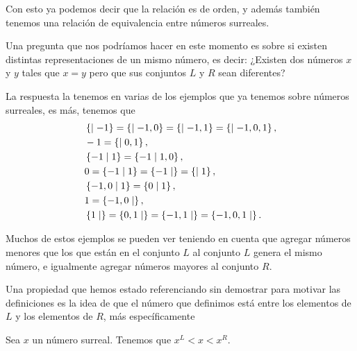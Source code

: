     Con esto ya podemos decir que la relaci\'on es de orden, y adem\'as tambi\'en tenemos una relaci\'on de equivalencia entre n\'umeros surreales.

    Una pregunta que nos podr\'iamos hacer en este momento es sobre si existen distintas representaciones de un mismo n\'umero, es decir: ¿Existen dos n\'umeros $x$ y $y$ tales que $x=y$ pero que sus conjuntos $L$ y $R$ sean diferentes?

    La respuesta la tenemos en varias de los ejemplos que ya tenemos sobre n\'umeros surreales, es m\'as, tenemos que
    \begin{align*}
        &\left\{\mid -1\right\} = \left\{\mid -1,0\right\} = \left\{\mid -1,1\right\} = \left\{\mid -1,0,1\right\}, \\
        &-1 = \left\{\mid 0,1\right\},\\
        &\left\{-1\mid 1\right\} = \left\{-1\mid 1,0\right\},\\
        &0 = \left\{-1\mid 1\right\} = \left\{-1\mid \right\} = \left\{\mid 1\right\},\\
        &\left\{-1,0\mid 1\right\} = \left\{0\mid 1\right\},\\
        &1 = \left\{-1,0\mid \right\},\\
        &\left\{1\mid \right\} = \left\{0,1\mid \right\} = \left\{-1,1\mid \right\} = \left\{-1,0,1\mid \right\}.
    \end{align*}

    Muchos de estos ejemplos se pueden ver teniendo en cuenta que agregar n\'umeros menores que los que est\'an en el conjunto $L$ al conjunto $L$ genera el mismo n\'umero, e igualmente agregar n\'umeros mayores al conjunto $R$.

    Una propiedad que hemos estado referenciando sin demostrar para motivar las definiciones es la idea de que el n\'umero que definimos est\'a entre los elementos de $L$ y los elementos de $R$, m\'as espec\'ificamente

    \begin{theorem}
        Sea $x$ un n\'umero surreal. Tenemos que $x^L < x < x^R$.
    \end{theorem}

